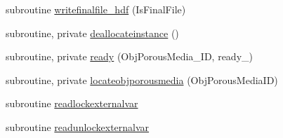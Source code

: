 \begin{DoxyCompactItemize}
subroutine \mbox{\hyperlink{namespacemoduleporousmedia_aa65138badcf5c2f27aad4149d87bcd10}{writefinalfile\+\_\+hdf}} (Is\+Final\+File)
\item 
subroutine, private \mbox{\hyperlink{namespacemoduleporousmedia_a7941341d1b0822b150125db812b3fc76}{deallocateinstance}} ()
\item 
subroutine, private \mbox{\hyperlink{namespacemoduleporousmedia_a9773f71db5ddd0e9b7ddeac94fc33e39}{ready}} (Obj\+Porous\+Media\+\_\+\+ID, ready\+\_\+)
\item 
subroutine, private \mbox{\hyperlink{namespacemoduleporousmedia_ac6ac9e34fbd80443bbf33b5006e8b25e}{locateobjporousmedia}} (Obj\+Porous\+Media\+ID)
\item 
subroutine \mbox{\hyperlink{namespacemoduleporousmedia_acfd0df7c0db51fe2a9c3ab697d07b548}{readlockexternalvar}}
\item 
subroutine \mbox{\hyperlink{namespacemoduleporousmedia_ade70c21b16e6288bf0e789900f845c5a}{readunlockexternalvar}}
\end{DoxyCompactItemize}
